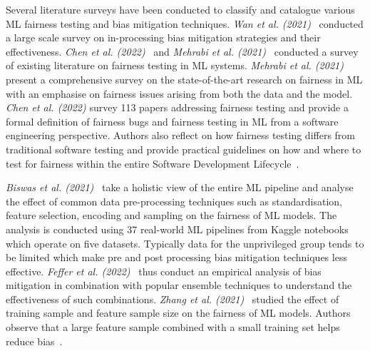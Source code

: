 \documentclass[conference]{IEEEtran}
\begin{document}
Several literature surveys have been conducted to classify and catalogue various ML fairness testing and bias mitigation techniques. \emph{Wan et al. (2021)}~\cite{wan2021modeling} conducted a large scale survey on in-processing bias mitigation strategies and their effectiveness. \emph{Chen et al. (2022)}~\cite{chen2022fairness} and \emph{Mehrabi et al. (2021)}~\cite{mehrabi2021survey} conducted a survey of existing literature on fairness testing in ML systems. \emph{Mehrabi et al. (2021)}~\cite{mehrabi2021survey} present a comprehensive survey on the state-of-the-art research on fairness in ML with an emphasise on fairness issues arising from both the data and the model. \emph{Chen et al. (2022)}\cite{chen2022fairness} survey 113 papers addressing fairness testing and provide a formal definition of fairness bugs and fairness testing in ML from a software engineering perspective. Authors also reflect on how fairness testing differs from traditional software testing and provide practical guidelines on how and where to test for fairness within the entire Software Development Lifecycle \cite{wan2021modeling,chen2022fairness,mehrabi2021survey}.

\emph{Biswas et al. (2021)}~\cite{biswas2021fair} take a holistic view of the entire ML pipeline and analyse the effect of common data pre-processing techniques such as standardisation, feature selection, encoding and sampling on the fairness of ML models. The analysis is conducted using 37 real-world ML pipelines from Kaggle notebooks which operate on five datasets. Typically data for the unprivileged group tends to be limited which make pre and post processing bias mitigation techniques less effective. \emph{Feffer et al. (2022)}~\cite{feffer2022empirical} thus conduct an empirical analysis of bias mitigation in combination with popular ensemble techniques to understand the effectiveness of such combinations. \emph{Zhang et al. (2021)}~\cite{zhang2021ignorance} studied the effect of training sample and feature sample size on the fairness of ML models. Authors observe that a large feature sample combined with a small training set helps reduce bias \cite{biswas2021fair,feffer2022empirical,zhang2021ignorance}.
\end{document}
